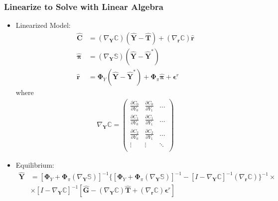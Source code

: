 \documentclass[english,xcolor=svgnames]{beamer}
\begin{document}
\begin{frame}
    \frametitle{Linearize to Solve with Linear Algebra}
    \begin{itemize}
        \item Linearized Model:
        \begin{align*}
            \bm{\hat{C}} &= (\nabla_{\bm{Y}}\pmb{\mathbb{C}}) (\bm{\hat{Y}} - \bm{\hat{T}}) + (\nabla_{\bm{r}}\pmb{\mathbb{C}})\bm{\hat{r}} \\
            \bm{\hat{\pi}} &= (\nabla_{\bm{Y}}\pmb{\mathbb{S}})(\bm{\hat{Y}} - \bm{\hat{Y}}^*)  \\
            \bm{\hat{r}} &= \bm{\Phi}_Y (\bm{\hat{Y}} - \bm{\hat{Y}}^*) +  \bm{\Phi}_\pi \bm{\hat{\pi}} + \bm{\epsilon}^r 
        \end{align*}
        where
        \begin{align*}
            \nabla_{\bm{Y}}\pmb{\mathbb{C}} = 
            \begin{pmatrix}
                \frac{\partial C_{0}}{\partial Y_0} & \frac{\partial C_{0}}{\partial Y_1} & \hdots \\
                \frac{\partial C_{1}}{\partial Y_0} & \frac{\partial C_{1}}{\partial Y_1} & \hdots \\
                \frac{\partial C_{2}}{\partial Y_0} & \frac{\partial C_{2}}{\partial Y_1} & \hdots \\
                \vdots & \vdots & \ddots \\
            \end{pmatrix}
        \end{align*}
        \item Equilibrium:
         \begin{align*}
             \bm{\hat{Y}} &=  [ \bm{\Phi}_Y  +  \bm{\Phi}_\pi (\nabla_{\bm{Y}}\pmb{\mathbb{S}}) ]^{-1} \{[ \bm{\Phi}_Y  +  \bm{\Phi}_\pi (\nabla_{\bm{Y}}\pmb{\mathbb{S}}) ]^{-1} - [I - \nabla_{\bm{Y}}\pmb{\mathbb{C}}]^{-1}(\nabla_{\bm{r}}\pmb{\mathbb{C}})  \}^{-1}  \times\\ 
             &\times[I - \nabla_{\bm{Y}}\pmb{\mathbb{C}}]^{-1} [\bm{\hat{G}} - (\nabla_{\bm{Y}}\pmb{\mathbb{C}})\bm{\hat{T}} + (\nabla_{\bm{r}}\pmb{\mathbb{C}})\bm{\epsilon}^r ]  
         \end{align*}
    \end{itemize}
\end{frame}
\end{document}
